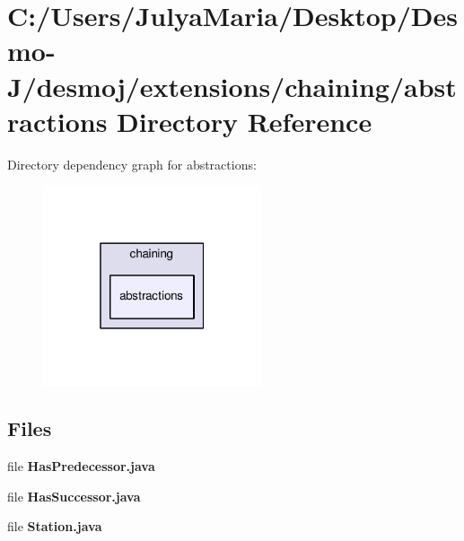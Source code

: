 \section{C\-:/\-Users/\-Julya\-Maria/\-Desktop/\-Desmo-\/\-J/desmoj/extensions/chaining/abstractions Directory Reference}
\label{dir_aa1743d694593c31836aed25833903f7}
Directory dependency graph for abstractions\-:
\nopagebreak
\begin{figure}[H]
\begin{center}
\leavevmode
\includegraphics[width=182pt]{dir_aa1743d694593c31836aed25833903f7_dep}
\end{center}
\end{figure}
\subsection*{Files}
\begin{DoxyCompactItemize}
\item 
file {\bfseries Has\-Predecessor.\-java}
\item 
file {\bfseries Has\-Successor.\-java}
\item 
file {\bfseries Station.\-java}
\end{DoxyCompactItemize}
